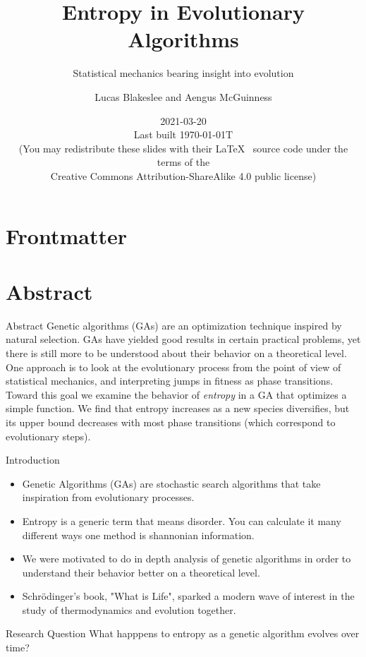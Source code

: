 \documentclass[10pt,aspectratio=169]{beamer}
\title{Entropy in Evolutionary Algorithms}
\subtitle{Statistical mechanics bearing insight into evolution}
\author{Lucas Blakeslee and Aengus McGuinness}
\institute[SF High]{
  Santa Fe High School \\
  Institute for Computing in Research}
\date{2021-03-20 \\
  {\smaller[2] Last built \today{}T\currenttime } \\
  \smallskip
      {\smaller[4] (You may redistribute these slides with their \LaTeX\
        \vspace{-0.1cm}
        source code under the terms of the \\
        Creative Commons Attribution-ShareAlike 4.0 public license)}
}
\begin{document}
\section*{Frontmatter}

\begin{frame}
  \maketitle
\end{frame}

\section{Abstract}

\begin{frame}{Abstract}
	Genetic algorithms (GAs) are an optimization technique inspired by
	natural selection. GAs have yielded good results in certain practical
	problems, yet there is still more to be understood about their
	behavior on a theoretical level. One approach is to look at the
	evolutionary process from the point of view of statistical mechanics,
	and interpreting jumps in fitness as phase transitions. Toward this
	goal we examine the behavior of \emph{entropy} in a GA that optimizes
	a simple function.  We find that entropy increases as a new species
	diversifies, but its upper bound decreases with most phase
	transitions (which correspond to evolutionary steps).
\end{frame}

\begin{frame}{Introduction}
	\begin{itemize}
		\item Genetic Algorithms (GAs) are stochastic search algorithms that take inspiration from evolutionary processes. 
		\item Entropy is a generic term that means disorder. You can calculate it many different ways one method is shannonian information.
		\item We were motivated to do in depth analysis of genetic algorithms in order to understand their behavior better on a theoretical level.
		\item Schrödinger's book, "What is Life", sparked a modern wave of interest in the study of thermodynamics and evolution together.
	\end{itemize}
\end{frame}

\begin{frame}{Research Question}
		What happpens to entropy as a genetic algorithm evolves over time? 
\end{frame}
\end{document}
